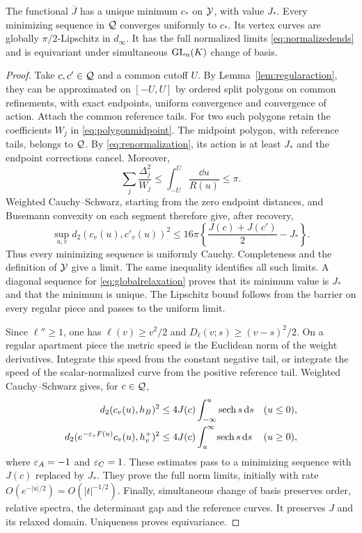 \begin{theorem}\label{thm:relaxedminimum}
The functional $\overline J$ has a unique minimum $c_*$ on $\mathcal Y$,
with value $J_*$. Every minimizing sequence in $\mathcal Q$ converges
uniformly to $c_*$. Its vertex curves are globally $\pi/2$-Lipschitz
in $d_\infty$. It has the full normalized limits
\eqref{eq:normalizedends} and is equivariant under simultaneous
$\operatorname{GL}_n(K)$ change of basis.
\end{theorem}

\begin{proof}
Take $c,c'\in\mathcal Q$ and a common cutoff $U$. By
Lemma~\ref{lem:regularaction}, they can be approximated on $[-U,U]$
by ordered split polygons on common refinements, with exact endpoints,
uniform convergence and convergence of action. Attach the common
reference tails. For two such polygons retain the coefficients $W_j$
in \eqref{eq:polygonmidpoint}. The midpoint polygon, with reference
tails, belongs to $\mathcal Q$. By \eqref{eq:renormalization}, its action
is at least $J_*$ and the endpoint corrections cancel. Moreover,
\[
 \sum_j\frac{\Delta_j^2}{W_j}
 \le\int_{-U}^U\frac{\dd u}{R(u)}\le\pi.
\]
Weighted Cauchy--Schwarz, starting from the zero endpoint distances,
and Busemann convexity on each segment therefore give, after recovery,
\begin{equation}\label{eq:globalstability}
 \sup_{u,v}d_2(c_v(u),c'_v(u))^2
 \le16\pi\left\{\frac{J(c)+J(c')}{2}-J_*\right\}.
\end{equation}
Thus every minimizing sequence is uniformly Cauchy. Completeness and
the definition of $\mathcal Y$ give a limit. The same inequality identifies
all such limits. A diagonal sequence for \eqref{eq:globalrelaxation}
proves that its minimum value is $J_*$ and that the minimum is unique.
The Lipschitz bound follows from the barrier on every regular piece
and passes to the uniform limit.

Since $\ell''\ge1$, one has
$\ell(v)\ge v^2/2$ and $D_\ell(v;s)\ge(v-s)^2/2$.
On a regular apartment piece the metric speed is the Euclidean norm
of the weight derivatives. Integrate this speed from the constant
negative tail, or integrate the speed of the scalar-normalized curve
from the positive reference tail. Weighted Cauchy--Schwarz gives,
for $c\in\mathcal Q$,
\begin{equation}\label{eq:preliminarytailbounds}
 \begin{aligned}
 d_2(c_v(u),h_B)^2
   &\le4J(c)\int_{-\infty}^u\operatorname{sech} s\,\mathrm d s &&(u\le0),\\
 d_2(e^{-\varepsilon_vF(u)}c_v(u),h_v^+)^2
   &\le4J(c)\int_u^\infty\operatorname{sech} s\,\mathrm d s &&(u\ge0),
 \end{aligned}
\end{equation}
where $\varepsilon_A=-1$ and $\varepsilon_C=1$. These estimates pass to a minimizing
sequence with $J(c)$ replaced by $J_*$. They prove the full norm
limits, initially with rate $O(e^{-|u|/2})=O(|t|^{-1/2})$.
Finally, simultaneous change of basis preserves order, relative spectra,
the determinant gap and the reference curves. It preserves $J$ and
its relaxed domain. Uniqueness proves equivariance.
\end{proof}


